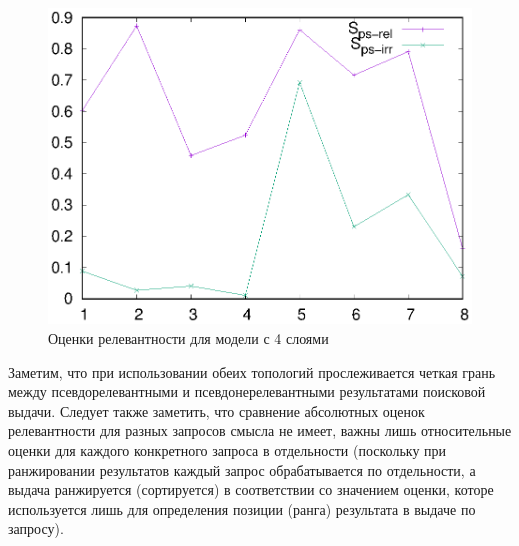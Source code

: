 \begin{figure}
    \centerline{\includegraphics[scale=0.8]{312-2_scores.eps}}
    \caption{Оценки релевантности для модели с 4 слоями}\label{fig:wn-scores-2}
\end{figure}

Заметим, что при использовании обеих топологий прослеживается четкая грань между псевдорелевантными и псевдонерелевантными результатами поисковой выдачи.
Следует также заметить, что сравнение абсолютных оценок релевантности для разных запросов смысла не имеет, важны лишь относительные оценки для каждого 
конкретного запроса в отдельности (поскольку при ранжировании результатов каждый запрос обрабатывается по отдельности, а выдача ранжируется (сортируется)
в соответствии со значением оценки, которе используется лишь для определения позиции (ранга) результата в выдаче по запросу).

